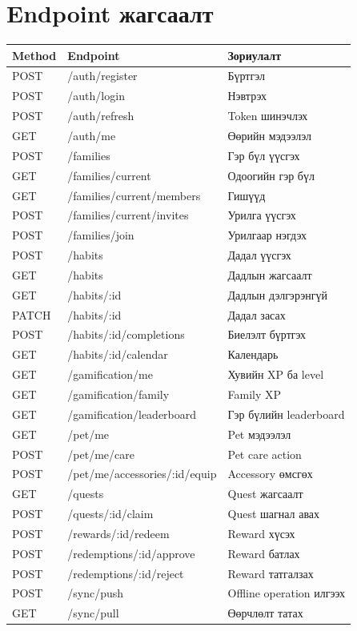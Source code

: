 \documentclass[12pt,a4paper,oneside]{report}
\begin{document}
\section{Endpoint жагсаалт}
\begin{longtable}{p{}p{}p{}}
\toprule
\textbf{Method} & \textbf{Endpoint} & \textbf{Зориулалт}\\
\midrule
POST & /auth/register & Бүртгэл\\
POST & /auth/login & Нэвтрэх\\
POST & /auth/refresh & Token шинэчлэх\\
GET & /auth/me & Өөрийн мэдээлэл\\
POST & /families & Гэр бүл үүсгэх\\
GET & /families/current & Одоогийн гэр бүл\\
GET & /families/current/members & Гишүүд\\
POST & /families/current/invites & Урилга үүсгэх\\
POST & /families/join & Урилгаар нэгдэх\\
POST & /habits & Дадал үүсгэх\\
GET & /habits & Дадлын жагсаалт\\
GET & /habits/:id & Дадлын дэлгэрэнгүй\\
PATCH & /habits/:id & Дадал засах\\
POST & /habits/:id/completions & Биелэлт бүртгэх\\
GET & /habits/:id/calendar & Календарь\\
GET & /gamification/me & Хувийн XP ба level\\
GET & /gamification/family & Family XP\\
GET & /gamification/leaderboard & Гэр бүлийн leaderboard\\
GET & /pet/me & Pet мэдээлэл\\
POST & /pet/me/care & Pet care action\\
POST & /pet/me/accessories/:id/equip & Accessory өмсгөх\\
GET & /quests & Quest жагсаалт\\
POST & /quests/:id/claim & Quest шагнал авах\\
POST & /rewards/:id/redeem & Reward хүсэх\\
POST & /redemptions/:id/approve & Reward батлах\\
POST & /redemptions/:id/reject & Reward татгалзах\\
POST & /sync/push & Offline operation илгээх\\
GET & /sync/pull & Өөрчлөлт татах\\
\bottomrule
\end{longtable}
\end{document}
